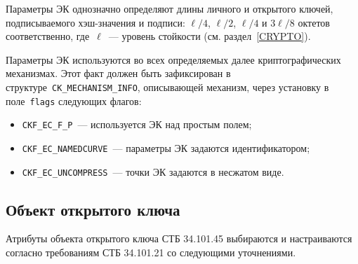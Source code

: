 Параметры ЭК однозначно определяют длины личного и открытого ключей, 
подписываемого хэш-значения и подписи: $\ell/4$, $\ell/2$, $\ell/4$ и $3\ell/8$ 
октетов соответственно, где~$\ell$~--- уровень стойкости (см. 
раздел~\ref{CRYPTO}).

Параметры ЭК используются во всех определяемых далее криптографических 
механизмах. Этот факт должен быть зафиксирован в 
структуре~\verb|CK_MECHANISM_INFO|, описывающей механизм,  
через установку в поле~\texttt{flags} следующих флагов:
\begin{itemize}
\item
\verb|CKF_EC_F_P|~--- используется ЭК над простым полем;
\item
\verb|CKF_EC_NAMEDCURVE|~--- параметры ЭК задаются идентификатором;
\item
\verb|CKF_EC_UNCOMPRESS|~--- точки ЭК задаются в несжатом виде.
\end{itemize}

\subsection{Объект открытого ключа}\label{CRYPTOKI.Pubkey}

Атрибуты объекта открытого ключа СТБ 34.101.45 
выбираются и настраиваются согласно требованиям СТБ 34.101.21 
со следующими уточнениями.

